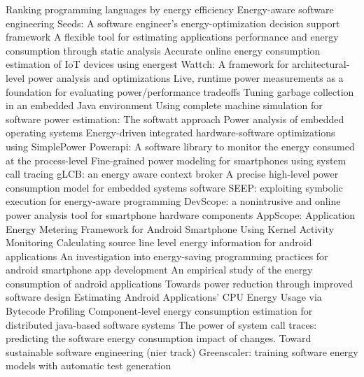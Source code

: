 \citep{Pereira2021}  Ranking programming languages by energy efficiency
\citep{Eder2017} Energy-aware software engineering
\citep{Manotas2014} Seeds: A software engineer's energy-optimization decision support framework
\citep{Marantos2021} A flexible tool for estimating applications performance and energy consumption through static analysis
\citep{Sabovic2020} Accurate online energy consumption estimation of {IoT} devices using energest
\citep{Brooks2000} Wattch: A framework for architectural-level power analysis and optimizations
\citep{Joseph2001} Live, runtime power measurements as a foundation for evaluating power/performance tradeoffs
\citep{Chen2002} Tuning garbage collection in an embedded Java environment
\citep{Gurumurthi2002} Using complete machine simulation for software power estimation: The softwatt approach
\citep{Dick2000} Power analysis of embedded operating systems
\citep{Vijaykrishnan2000} Energy-driven integrated hardware-software optimizations using SimplePower
\citep{Bourdon2013} Powerapi: A software library to monitor the energy consumed at the process-level
\citep{Pathak2011} Fine-grained power modeling for smartphones using system call tracing
\citep{Ardito2013} gLCB: an energy aware context broker
\citep{Ibrahim2011} A precise high-level power consumption model for embedded systems software
\citep{Honig2012} SEEP: exploiting symbolic execution for energy-aware programming
\citep{Jung2012} DevScope: a nonintrusive and online power analysis tool for smartphone hardware components
\citep{Yoon2012} AppScope: Application Energy Metering Framework for Android Smartphone Using Kernel Activity Monitoring
\citep{Li2013} Calculating source line level energy information for android applications
\citep{Li2014a} An investigation into energy-saving programming practices for android smartphone app development
\citep{Li2014b} An empirical study of the energy consumption of android applications
\citep{Sahin2012a} Towards power reduction through improved software design
\citep{Hao2012} Estimating Android Applications’ CPU Energy Usage via Bytecode Profiling
\citep{Seo2008a} Component-level energy consumption estimation for distributed java-based software systems
\citep{Aggarwal2014} The power of system call traces: predicting the software energy consumption impact of changes.
\citep{Amsel2011} Toward sustainable software engineering (nier track)
\citep{Chowdhury2019} Greenscaler: training software energy models with automatic test generation
